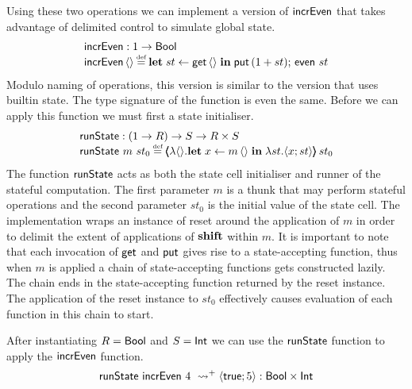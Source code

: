 \documentclass[12pt,phd,lfcs,twoside,openright,logo,leftchapter,normalheadings]{infthesis}
\theoremstyle{plain}
\theoremstyle{definition}
\begin{document}
Using these two operations we can implement a version of $\mathsf{incrEven}$
that takes advantage of delimited control to simulate global state.
%
\[
  \bl
    \incrEven : \UnitType \to \Bool\\
    \incrEven\,\Unit \defas \Let\;st \revto \getF\,\Unit\;\In\;\putF\,(1 + st);\,\even~st
  \el
\]
%
Modulo naming of operations, this version is similar to the version
that uses builtin state. The type signature of the function is even
the same.
%
Before we can apply this function we must first a state initialiser.
%
\[
  \bl
    \runState : (\UnitType \to R) \to S \to R \times S\\
    \runState~m~st_0 \defas \reset{\lambda\Unit.\Let\;x \revto m\,\Unit\;\In\;\lambda st. \Record{x;st}}\,st_0
      \bl
      \el
  \el
\]
%
The function $\mathsf{runState}$ acts as both the state cell initialiser and
runner of the stateful computation. The first parameter $m$ is a thunk
that may perform stateful operations and the second parameter $st_0$
is the initial value of the state cell. The implementation wraps an
instance of reset around the application of $m$ in order to delimit
the extent of applications of $\mathbf{shift}$ within $m$. It is important to
note that each invocation of $\mathsf{get}$ and $\mathsf{put}$ gives rise to a
state-accepting function, thus when $m$ is applied a chain of
state-accepting functions gets constructed lazily. The chain ends in
the state-accepting function returned by the reset instance. The
application of the reset instance to $st_0$ effectively causes
evaluation of each function in this chain to start.

After instantiating $R = \mathsf{Bool}$ and $S = \mathsf{Int}$ we can use the
$\mathsf{runState}$ function to apply the $\mathsf{incrEven}$ function.
%
\[
  \mathsf{runState}~\mathsf{incrEven}~4~ \leadsto^+ \langle \mathsf{true};5 \rangle : \mathsf{Bool} \times \mathsf{Int}
\]

\end{document}
